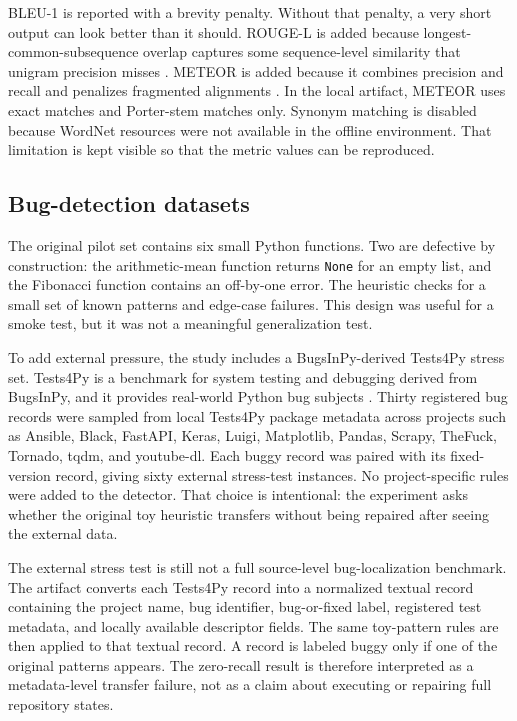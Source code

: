 \documentclass[preprint,12pt]{elsarticle}
\begin{document}
BLEU-1 is reported with a brevity penalty. Without that penalty, a very short output can look better than it should. ROUGE-L is added because longest-common-subsequence overlap captures some sequence-level similarity that unigram precision misses \cite{lin2004rouge}. METEOR is added because it combines precision and recall and penalizes fragmented alignments \cite{lavie2007meteor}. In the local artifact, METEOR uses exact matches and Porter-stem matches only. Synonym matching is disabled because WordNet resources were not available in the offline environment. That limitation is kept visible so that the metric values can be reproduced.

\subsection{Bug-detection datasets}

The original pilot set contains six small Python functions. Two are defective by construction: the arithmetic-mean function returns \texttt{None} for an empty list, and the Fibonacci function contains an off-by-one error. The heuristic checks for a small set of known patterns and edge-case failures. This design was useful for a smoke test, but it was not a meaningful generalization test.

To add external pressure, the study includes a BugsInPy-derived Tests4Py stress set. Tests4Py is a benchmark for system testing and debugging derived from BugsInPy, and it provides real-world Python bug subjects \cite{smytzek2023tests4py}. Thirty registered bug records were sampled from local Tests4Py package metadata across projects such as Ansible, Black, FastAPI, Keras, Luigi, Matplotlib, Pandas, Scrapy, TheFuck, Tornado, tqdm, and youtube-dl. Each buggy record was paired with its fixed-version record, giving sixty external stress-test instances. No project-specific rules were added to the detector. That choice is intentional: the experiment asks whether the original toy heuristic transfers without being repaired after seeing the external data.

The external stress test is still not a full source-level bug-localization benchmark. The artifact converts each Tests4Py record into a normalized textual record containing the project name, bug identifier, bug-or-fixed label, registered test metadata, and locally available descriptor fields. The same toy-pattern rules are then applied to that textual record. A record is labeled buggy only if one of the original patterns appears. The zero-recall result is therefore interpreted as a metadata-level transfer failure, not as a claim about executing or repairing full repository states.
\end{document}
